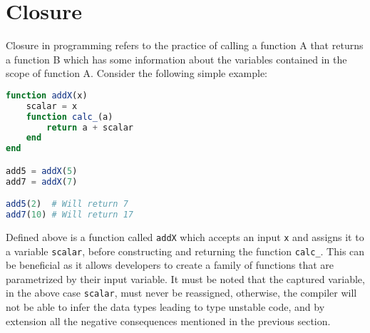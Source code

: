 \section{Closure}
Closure in programming refers to the practice of calling a function A that returns a function B which has some
information about the variables contained in the scope of function A. Consider the following simple example:
\begin{lstlisting}[language=Julia]
function addX(x)
    scalar = x
    function calc_(a)
        return a + scalar
    end
end

add5 = addX(5)
add7 = addX(7)

add5(2)  # Will return 7
add7(10) # Will return 17
\end{lstlisting}
Defined above is a function called \lstinline[language=Julia]{addX} which accepts an input \lstinline[language=Julia]{x}
and assigns it to a variable \lstinline[language=Julia]{scalar}, before constructing and returning the function
\lstinline[language=Julia]{calc_}. This can be beneficial as it allows developers to create a family of functions that
are parametrized by their input variable.  It must be noted that the
captured variable, in the above case \lstinline[language=Julia]{scalar}, must never be reassigned, otherwise, the
compiler will not be able to infer the data types leading to type unstable code, and by extension all the negative
consequences mentioned in the previous section.

